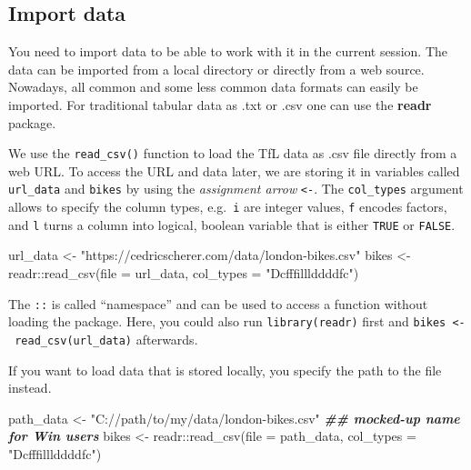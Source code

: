 \documentclass[
]{krantz}
\makeatletter
\newenvironment{Shaded}{\begin{snugshade}}{\end{snugshade}}
\newcommand{\AttributeTok}[1]{\textcolor[rgb]{0.61,0.61,0.61}{#1}}
\newcommand{\DocumentationTok}[1]{\textcolor[rgb]{0.37,0.37,0.37}{\textbf{\textit{#1}}}}
\newcommand{\FunctionTok}[1]{\textcolor[rgb]{0,0,0}{#1}}
\newcommand{\NormalTok}[1]{#1}
\newcommand{\OtherTok}[1]{\textcolor[rgb]{0.37,0.37,0.37}{#1}}
\newcommand{\SpecialCharTok}[1]{\textcolor[rgb]{0,0,0}{#1}}
\newcommand{\StringTok}[1]{\textcolor[rgb]{0.5,0.5,0.5}{#1}}
\newenvironment{kframe}{%
\medskip{}
\setlength{\fboxsep}{.8em}
 \def\at@end@of@kframe{}%
 \ifinner\ifhmode%
  \def\at@end@of@kframe{\end{minipage}}%
  \begin{minipage}{\columnwidth}%
 \fi\fi%
 \def\FrameCommand##1{\hskip\@totalleftmargin \hskip-\fboxsep
 \colorbox{shadecolor}{##1}\hskip-\fboxsep
     \hskip-\linewidth \hskip-\@totalleftmargin \hskip\columnwidth}%
 \MakeFramed {\advance\hsize-\width
   \@totalleftmargin\z@ \linewidth\hsize
   \@setminipage}}%
 {\par\unskip\endMakeFramed%
 \at@end@of@kframe}
\renewenvironment{Shaded}{\begin{kframe}}{\end{kframe}}
\makeatother
\begin{document}
\hypertarget{import-data}{%
\subsection{Import data}\label{import-data}}

You need to import data to be able to work with it in the current session. The data can be imported from a local directory or directly from a web source. Nowadays, all common and some less common data formats can easily be imported. For traditional tabular data as .txt or .csv one can use the \textbf{readr} package.

We use the \texttt{read\_csv()} function to load the TfL data as .csv file directly from a web URL. To access the URL and data later, we are storing it in variables called \texttt{url\_data} and \texttt{bikes} by using the \emph{assignment arrow} \texttt{\textless{}-}. The \texttt{col\_types} argument allows to specify the column types, e.g.~\texttt{i} are integer values, \texttt{f} encodes factors, and \texttt{l} turns a column into logical, boolean variable that is either \texttt{TRUE} or \texttt{FALSE}.

\begin{Shaded}
\begin{Highlighting}[]
\NormalTok{url\_data }\OtherTok{\textless{}{-}} \StringTok{"https://cedricscherer.com/data/london{-}bikes.csv"}
\NormalTok{bikes }\OtherTok{\textless{}{-}}\NormalTok{ readr}\SpecialCharTok{::}\FunctionTok{read\_csv}\NormalTok{(}\AttributeTok{file =}\NormalTok{ url\_data, }\AttributeTok{col\_types =} \StringTok{"Dcfffilllddddfc"}\NormalTok{)}
\end{Highlighting}
\end{Shaded}

The \texttt{::} is called ``namespace'' and can be used to access a function without loading the package. Here, you could also run \texttt{library(readr)} first and \texttt{bikes\ \textless{}-\ read\_csv(url\_data)} afterwards.

If you want to load data that is stored locally, you specify the path to the file instead.

\begin{Shaded}
\begin{Highlighting}[]
\NormalTok{path\_data }\OtherTok{\textless{}{-}} \StringTok{"C://path/to/my/data/london{-}bikes.csv"} \DocumentationTok{\#\# mocked{-}up name for Win users}
\NormalTok{bikes }\OtherTok{\textless{}{-}}\NormalTok{ readr}\SpecialCharTok{::}\FunctionTok{read\_csv}\NormalTok{(}\AttributeTok{file =}\NormalTok{ path\_data, }\AttributeTok{col\_types =} \StringTok{"Dcfffilllddddfc"}\NormalTok{)}
\end{Highlighting}
\end{Shaded}
\end{document}
